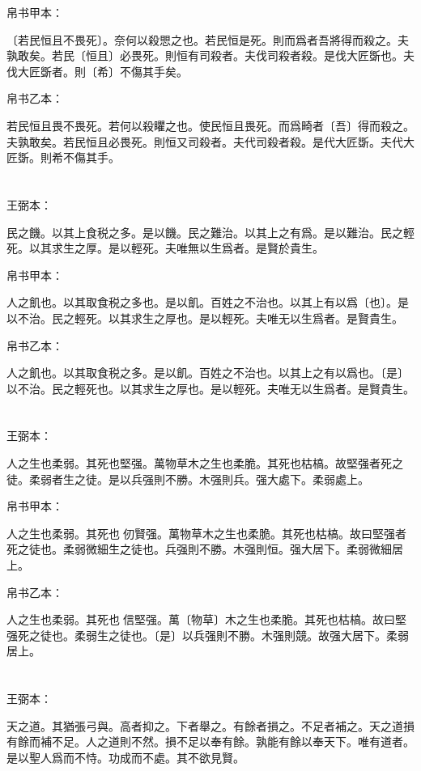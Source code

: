 \documentclass[a5paper]{ctexbook}
\begin{document}
    
    帛书甲本：

    〔若民恒且不畏死〕。奈何以殺愳之也。若民恒是死。則而爲者吾將得而殺之。夫孰敢矣。若民〔恒且〕必畏死。則恒有司殺者。夫伐司殺者殺。是伐大匠斲也。夫伐大匠斲者。則〔希〕不傷其手矣。

    帛书乙本：

    若民恒且畏不畏死。若何以殺䂂之也。使民恒且畏死。而爲畸者〔吾〕得而殺之。夫孰敢矣。若民恒且必畏死。則恒又司殺者。夫代司殺者殺。是代大匠斲。夫代大匠斲。則希不傷其手。

    \chapter{}
    王弼本：

    民之饑。以其上食税之多。是以饑。民之難治。以其上之有爲。是以難治。民之輕死。以其求生之厚。是以輕死。夫唯無以生爲者。是賢於貴生。

    
    帛书甲本：

    人之飢也。以其取食税之多也。是以飢。百姓之不治也。以其上有以爲〔也〕。是以不治。民之輕死。以其求生之厚也。是以輕死。夫唯无以生爲者。是賢貴生。

    帛书乙本：

    人之飢也。以其取食税之多。是以飢。百姓之不治也。以其上之有以爲也。〔是〕以不治。民之輕死也。以其求生之厚也。是以輕死。夫唯无以生爲者。是賢貴生。

    \chapter{}
    王弼本：

    人之生也柔弱。其死也堅强。萬物草木之生也柔脆。其死也枯槁。故堅强者死之徒。柔弱者生之徒。是以兵强則不勝。木强則兵。强大處下。柔弱處上。

    
    帛书甲本：

    人之生也柔弱。其死也𦵕仞賢强。萬物草木之生也柔脆。其死也枯槁。故曰堅强者死之徒也。柔弱微細生之徒也。兵强則不勝。木强則恒。强大居下。柔弱微細居上。

    帛书乙本：

    人之生也柔弱。其死也󱁌信堅强。萬〔物草〕木之生也柔脆。其死也枯槁。故曰堅强死之徒也。柔弱生之徒也。〔是〕以兵强則不勝。木强則競。故强大居下。柔弱居上。

    \chapter{}
    王弼本：

    天之道。其猶張弓與。高者抑之。下者舉之。有餘者損之。不足者補之。天之道損有餘而補不足。人之道則不然。損不足以奉有餘。孰能有餘以奉天下。唯有道者。是以聖人爲而不恃。功成而不處。其不欲見賢。
\end{document}
